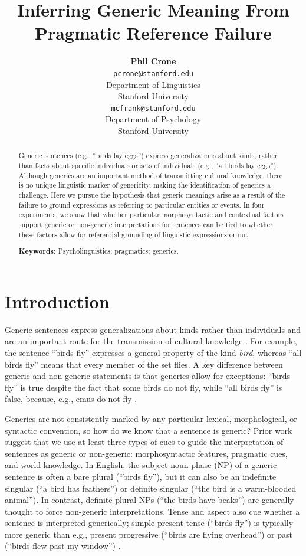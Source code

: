 \documentclass[10pt,letterpaper]{article}
\title{Inferring Generic Meaning From Pragmatic Reference Failure}
\author{{\large \bf Phil Crone} \\
	\texttt{pcrone@stanford.edu}\\
  Department of Linguistics \\
  Stanford University
  \And {\large \bf Michael C. Frank} \\
  \texttt{mcfrank@stanford.edu}\\
  Department of Psychology \\
  Stanford University}
\begin{document}
\maketitle

\begin{abstract}
Generic sentences (e.g., ``birds lay eggs'') express generalizations about kinds, rather than facts about specific individuals or sets of individuals (e.g., ``all birds lay eggs''). Although generics are an important method of transmitting cultural knowledge, there is no unique linguistic marker of genericity, making the identification of generics a challenge. Here we pursue the hypothesis that generic meanings arise as a result of the failure to ground expressions as referring to particular entities or events. In four experiments, we show that whether particular morphosyntactic and contextual factors support generic or non-generic interpretations for sentences can be tied to whether these factors allow for referential grounding of linguistic expressions or not.

\textbf{Keywords:} Psycholinguistics; pragmatics; generics.
\end{abstract}


\section{Introduction}

Generic sentences express generalizations about kinds rather than individuals and are an important route for the transmission of cultural knowledge \cite{gelman2003}. For example, the sentence ``birds fly'' expresses a general property of the kind \textit{bird}, whereas ``all birds fly'' means that every member of the set flies. A key difference between generic and non-generic statements is that generics allow for exceptions: ``birds fly'' is true despite the fact that some birds do not fly, while ``all birds fly'' is false, because, e.g., emus do not fly \cite{Prasada:2000}.

Generics are not consistently marked by any particular lexical, morphological, or syntactic convention, so how do we know that a sentence is generic? Prior work suggest that we use at least three types of cues to guide the interpretation of sentences as generic or non-generic: morphosyntactic features, pragmatic cues, and world knowledge. In English, the subject noun phase (NP) of a generic sentence is often a bare plural (``birds fly''), but it can also be an indefinite singular (``a bird has feathers'') or definite singular (``the bird is a warm-blooded animal''). In contrast, definite plural NPs (``the birds have beaks'') are generally thought to force non-generic interpretations. Tense and aspect also cue whether a sentence is interpreted generically; simple present tense (``birds fly'') is typically more generic than e.g., present progressive (``birds are flying overhead'') or past (``birds flew past my window'') \cite{Carlson:1977,Krifka:1995,Lyons:1977}.
\end{document}
